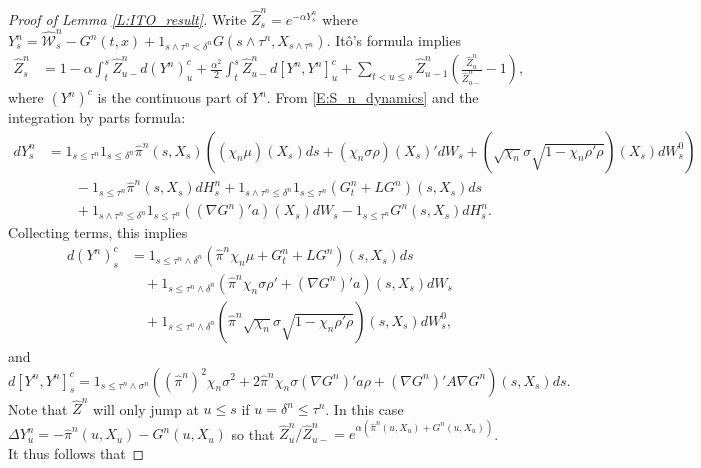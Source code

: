 \documentclass[11pt, letterpaper]{amsart}
\theoremstyle{definition}
\theoremstyle{remark}
\numberwithin{equation}{section}
\newcommand{\We}{\mathcal{W}}
\newcommand{\hwe}{\hat{\We}}
\newcommand{\hz}{\hat{Z}}
\newcommand{\hpi}{\hat{\pi}}
\newcommand{\ito}{It\^{o}}
\begin{document}
\begin{proof}[Proof of Lemma \ref{L:ITO_result}]
Write $\hz^n_s = e^{-\alpha Y^n_s}$ where $Y^n_s = \hwe^n_s - G^n(t,x) + 1_{s\wedge\tau^n < \delta^n} G(s\wedge\tau^n, X_{s\wedge\tau^n})$.  \ito's formula implies
\begin{equation}\label{E:ITO_1}
\begin{split}
\hz^n_s &=  1 - \alpha\int_t^s \hz^n_{u-}d(Y^n)^c_u + \frac{\alpha^2}{2}\int_t^s \hz^n_{u-}d[Y^n,Y^n]^c_u + \sum_{t<u\leq s}\hz^n_{u-1}\left(\frac{\hz^n_u}{\hz^n_{u-}}-1\right),
\end{split}
\end{equation}
where $(Y^n)^c$ is the continuous part of $Y^n$. From \eqref{E:S_n_dynamics} and the integration by parts formula:
\begin{equation*}
\begin{split}
dY^n_s & = 1_{s\leq\tau^n}1_{s\leq\delta^n}\hpi^n(s,X_s)\left(\left(\chi_n\mu\right)(X_s)ds + \left(\chi_n\sigma\rho\right)(X_s)'dW_s + \left(\sqrt{\chi_n}\sigma\sqrt{1-\chi_n\rho'\rho}\right)(X_s)dW^0_s\right)\\
&\qquad  - 1_{s\leq\tau^n}\hpi^n(s,X_s)dH^n_s + 1_{s\wedge\tau^n \leq \delta^n}1_{s\leq\tau^n}\left(G^n_t + LG^n\right)(s,X_s)ds\\
&\qquad  + 1_{s\wedge\tau^n\leq\delta^n}1_{s\leq\tau^n}\left((\nabla G^n)'a\right)(X_s)dW_s - 1_{s\leq\tau^n}G^n(s,X_s)dH^n_s.
\end{split}
\end{equation*}
Collecting terms, this implies
\begin{equation}\label{E:ITO_2}
\begin{split}
d(Y^n)^{c}_s &=1_{s\leq\tau^n\wedge\delta^n}\left(\hpi^n\chi_n\mu + G^n_t + LG^n\right)(s,X_s)ds\\
&\quad + 1_{s\leq\tau^n\wedge\delta^n}\left(\hpi^n\chi_n\sigma\rho' + (\nabla G^n)'a\right)(s,X_s)dW_s\\
&\quad + 1_{s\leq\tau^n\wedge\delta^n}\left(\hpi^n\sqrt{\chi_n}\sigma\sqrt{1-\chi_n\rho'\rho}\right)(s,X_s)dW^0_s,
\end{split}
\end{equation}
and
\begin{equation}\label{E:ITO_3}
d\left[Y^n,Y^n\right]^c_s = 1_{s\leq\tau^n\wedge\sigma^n}\left((\hpi^n)^2\chi_n\sigma^2 + 2\hpi^n\chi_n\sigma(\nabla G^n)'a\rho + (\nabla G^n)'A\nabla G^n\right)(s,X_s)ds.
\end{equation}
Note that $\hz^n$ will only jump at $u\leq s$ if $u=\delta^n\leq\tau^n$.  In this case $\Delta Y^n_u = -\hpi^n(u,X_u) - G^n(u,X_u)$ so that $\hz^n_u/\hz^n_{u-} = e^{\alpha(\hpi^n(u,X_u) + G^n(u,X_u))}$.  It thus follows that

\end{proof}
\end{document}
